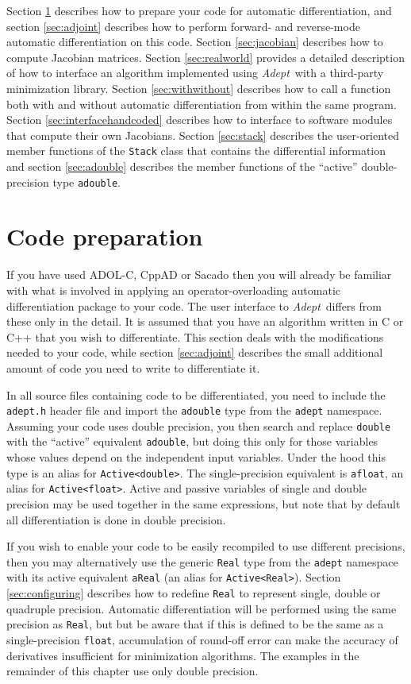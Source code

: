 \documentclass[a4,oneside]{book}
\def\codesize{\small}
\def\Adept{\emph{Adept}}
\def\code#1{{\codesize\texttt{#1}}}
\begin{document}
Section \ref{sec:preparation} describes how to prepare your code for
automatic differentiation, and section \ref{sec:adjoint} describes how
to perform forward- and reverse-mode automatic differentiation on this
code. Section \ref{sec:jacobian} describes how to compute Jacobian
matrices. Section \ref{sec:realworld} provides a detailed description
of how to interface an algorithm implemented using \Adept\ with a
third-party minimization library.  Section \ref{sec:withwithout}
describes how to call a function both with and without automatic
differentiation from within the same program. Section
\ref{sec:interfacehandcoded} describes how to interface to software
modules that compute their own Jacobians.  Section \ref{sec:stack}
describes the user-oriented member functions of the \code{Stack} class
that contains the differential information and section
\ref{sec:adouble} describes the member functions of the ``active''
double-precision type \code{adouble}.


\section{Code preparation}
\label{sec:preparation}
If you have used ADOL-C, CppAD or Sacado then you will already be
familiar with what is involved in applying an operator-overloading
automatic differentiation package to your code. The user interface to
\Adept\ differs from these only in the detail. It is assumed that you
have an algorithm written in C or C++ that you wish to
differentiate. This section deals with the modifications needed to
your code, while section \ref{sec:adjoint} describes the small
additional amount of code you need to write to differentiate it.

In all source files containing code to be differentiated, you need to
include the \code{adept.h} header file and import the \code{adouble}
type from the \code{adept} namespace. Assuming your code uses double
precision, you then search and replace \code{double} with the
``active'' equivalent \code{adouble}, but doing this only for those
variables whose values depend on the independent input variables.
Under the hood this type is an alias for \code{Active<double>}.  The
single-precision equivalent is \code{afloat}, an alias for
\code{Active<float>}.  Active and passive variables of single and
double precision may be used together in the same expressions, but
note that by default all differentiation is done in double precision.

If you wish to enable your code to be easily recompiled to use
different precisions, then you may alternatively use the generic
\code{Real} type from the \code{adept} namespace with its active
equivalent \code{aReal} (an alias for \code{Active<Real>}). Section
\ref{sec:configuring} describes how to redefine \code{Real} to
represent single, double or quadruple precision.  Automatic
differentiation will be performed using the same precision as
\code{Real}, but but be aware that if this is defined to be the same
as a single-precision \code{float}, accumulation of round-off error
can make the accuracy of derivatives insufficient for minimization
algorithms. The examples in the remainder of this chapter use only
double precision.
\end{document}
